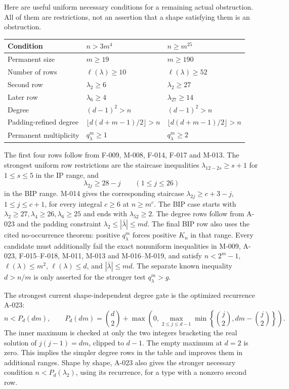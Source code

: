 \documentclass[11pt]{article}
\begin{document}
Here are useful uniform necessary conditions for a remaining
actual obstruction. All of them are restrictions, not an
assertion that a shape satisfying them is an obstruction.
\begin{center}
\renewcommand{\arraystretch}{1.2}
\begin{tabular}{@{}p{}p{}p{}@{}}
\toprule
Condition & \(n>3m^4\) & \(n\geq m^{25}\)\\
\midrule
Permanent size & \(m\geq19\) & \(m\geq190\)\\
Number of rows & \(\ell(\lambda)\geq10\) & \(\ell(\lambda)\geq52\)\\
Second row & \(\lambda_2\geq6\) & \(\lambda_2\geq27\)\\
Later row & \(\lambda_6\geq4\) & \(\lambda_{27}\geq14\)\\
Degree & \((d-1)^2>n\) & \((d-1)^2>n\)\\
Padding-refined degree & \(\lfloor d(d+m-1)/2\rfloor>n\) & \(\lfloor d(d+m-1)/2\rfloor>n\)\\
Permanent multiplicity & \(q^m_\lambda\geq1\) & \(q^m_\lambda\geq2\)\\
\bottomrule
\end{tabular}
\end{center}
The first four rows follow from F-009, M-008, F-014, F-017 and M-013.
The strongest uniform row restrictions are the staircase inequalities
\(\lambda_{12-2s}\geq s+1\) for \(1\leq s\leq5\) in
the IP range, and
\[
                  \lambda_{2j}\geq28-j\qquad(1\leq j\leq26)
\]
in the BIP range. M-014 gives the corresponding staircase
\(\lambda_{2j}\geq c+3-j\), \(1\leq j\leq c+1\),
for every integral \(c\geq6\) at \(n\geq m^c\).
The BIP case starts with
\(\lambda_2\geq27,\lambda_4\geq26,\lambda_6\geq25\)
and ends with \(\lambda_{52}\geq2\). The degree rows follow
from A-023 and the padding constraint
\(\lambda_2\leq|\bar\lambda|\leq md\). The final BIP
row also uses the cited no-occurrence theorem: positive
\(q^m_\lambda\) forces positive \(K_n\) in that range.
Every candidate must additionally fail the exact nonuniform
inequalities in M-009, A-023, F-015--F-018, M-011, M-013 and M-016--M-019,
and satisfy \(n<2^m-1\), \(\ell(\lambda)\leq m^2\),
\(\ell(\lambda)\leq d\), and \(|\bar\lambda|\leq md\).
The separate known inequality \(d>n/m\) is only asserted
for the stronger test \(q^m_\lambda>g\).

The strongest current shape-independent degree gate is the optimized
recurrence A-023:
\[
 n<P_d(dm),\qquad
 P_d(dm)=\binom d2+
 \max\!\left(0,\max_{2\leq j\leq d-1}
       \min\left\{\binom j2,dm-\binom j2\right\}\right).
\]
The inner maximum is checked at only the two integers bracketing
the real solution of \(j(j-1)=dm\), clipped to \(d-1\).
The empty maximum at \(d=2\) is zero. This implies the simpler
degree rows in the table and improves them in additional ranges.
Shape by shape, A-023 also gives the stronger necessary condition
\(n<P_d(\lambda_2)\), using its recurrence, for a type with a
nonzero second row.
\end{document}
